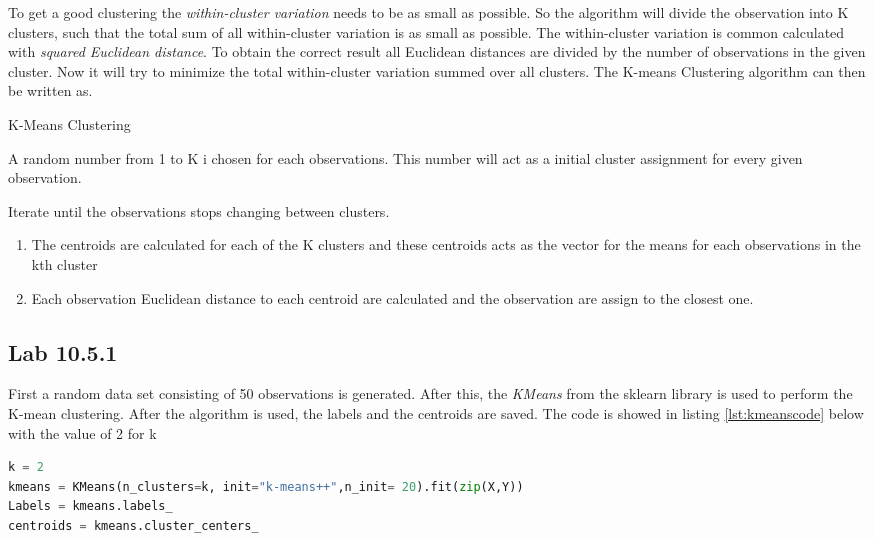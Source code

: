 To get a good clustering the \emph{within-cluster variation} needs to be as small as possible. So the algorithm will divide the observation into K clusters, such that the total sum of all within-cluster variation is as small as possible. The within-cluster variation is common calculated with \emph{squared Euclidean distance}. To obtain the correct result all Euclidean distances are divided by the number of observations in the given cluster. Now it will try to minimize the total within-cluster variation summed over all clusters.
The K-means Clustering algorithm can then be written as.

\begin{algorithm}
	\caption{K-Means Clustering}
	\label{algo:KMeansClustering}
	\begin{algorithmic}[1]
		\State A random number from 1 to K i chosen for each observations. This number will act as a initial cluster assignment for every given observation.
		
		\State 
		Iterate until the observations stops changing between clusters.
		\begin{enumerate}[label=(\alph*)]
			\item The centroids are calculated for each of the K clusters and these centroids acts as the vector for the means for each observations in the kth cluster
			
			\item Each observation Euclidean distance to  each centroid are calculated and the  observation are assign to the closest one.
		\end{enumerate}
	\end{algorithmic}
\end{algorithm}

\subsection{Lab 10.5.1}
First a random data set consisting of 50 observations is generated. After this, the \emph{KMeans} from the sklearn library is used to perform the K-mean clustering.
After the algorithm is used, the labels and the centroids are saved. The code is showed in listing \ref{lst:kmeanscode} below with the value of 2 for k
\begin{lstlisting}[language=Python, label=lst:kmeanscode, caption=The KMean function and the code who saved the labels and centroids]
k = 2
kmeans = KMeans(n_clusters=k, init="k-means++",n_init= 20).fit(zip(X,Y))
Labels = kmeans.labels_
centroids = kmeans.cluster_centers_
\end{lstlisting}

